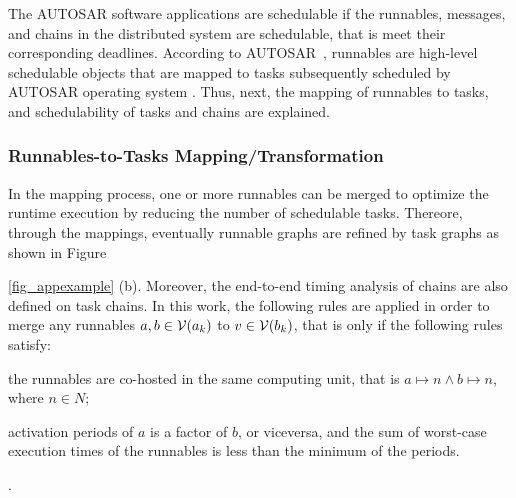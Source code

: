 The AUTOSAR software  applications are schedulable if the runnables, messages, and chains in the distributed system are schedulable, that is meet their corresponding deadlines. According to AUTOSAR~\cite{AUTOSAR2017SpecificationSoftware}, runnables are high-level schedulable objects that are mapped to tasks subsequently scheduled by AUTOSAR operating system \cite{bibid}. Thus, next, the mapping of runnables to tasks, and  schedulability of tasks and chains are explained.

\subsubsection{Runnables-to-Tasks Mapping/Transformation}\label{subsec_runnables-to-tasks}
In the mapping process, one or more runnables can be merged to optimize the runtime execution by reducing the number of schedulable tasks. Thereore, through the mappings, eventually runnable graphs are refined by task graphs as shown in Figure~{\ref{fig_appexample} (b). Moreover, the end-to-end timing analysis of chains are also defined on task chains. In this work, the following rules are applied in order to merge any runnables $a,b\in \mathcal{V}(a_{k})$ to $v\in \mathcal{V}(b_{k})$, that is only if the following rules satisfy:
\begin{enumerate*}[label=(\roman*)]
	\item the runnables are co-hosted in the same computing unit, that is $a\mapsto n \land b\mapsto n$, where $n\in N$;
	\item activation periods of $a$ is a factor of $b$, or viceversa, and the sum of worst-case execution times of the runnables is less than the minimum of the periods.
\end{enumerate*}.
	
}
